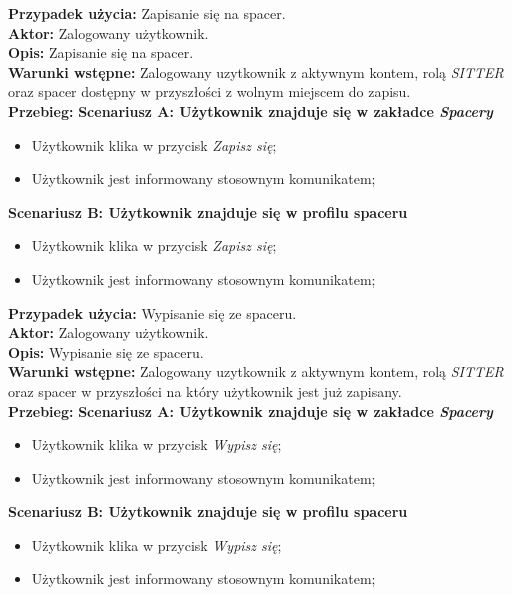 \noindent
\textbf{Przypadek użycia:} Zapisanie się na spacer. \\
\textbf{Aktor:} Zalogowany użytkownik. \\
\textbf{Opis:} Zapisanie się na spacer. \\
\textbf{Warunki wstępne:} Zalogowany uzytkownik z aktywnym kontem, rolą \textit{SITTER} oraz spacer dostępny w przyszłości z wolnym miejscem do zapisu. \\
\textbf{Przebieg:}
\textbf{Scenariusz A: Użytkownik znajduje się w zakładce \textit{Spacery}}
\begin{itemize}[leftmargin=1cm]
    \item Użytkownik klika w przycisk \textit{Zapisz się};
    \item Użytkownik jest informowany stosownym komunikatem;
\end{itemize}
\textbf{Scenariusz B: Użytkownik znajduje się w profilu spaceru}
\begin{itemize}[leftmargin=1cm]
    \item Użytkownik klika w przycisk \textit{Zapisz się};
    \item Użytkownik jest informowany stosownym komunikatem;
\end{itemize}

\noindent
\textbf{Przypadek użycia:} Wypisanie się ze spaceru. \\
\textbf{Aktor:} Zalogowany użytkownik. \\
\textbf{Opis:} Wypisanie się ze spaceru. \\
\textbf{Warunki wstępne:} Zalogowany uzytkownik z aktywnym kontem, rolą \textit{SITTER} oraz spacer w przyszłości na który użytkownik jest już zapisany. \\
\textbf{Przebieg:}
\textbf{Scenariusz A: Użytkownik znajduje się w zakładce \textit{Spacery}}
\begin{itemize}[leftmargin=1cm]
    \item Użytkownik klika w przycisk \textit{Wypisz się};
    \item Użytkownik jest informowany stosownym komunikatem;
\end{itemize}
\textbf{Scenariusz B: Użytkownik znajduje się w profilu spaceru}
\begin{itemize}[leftmargin=1cm]
    \item Użytkownik klika w przycisk \textit{Wypisz się};
    \item Użytkownik jest informowany stosownym komunikatem;
\end{itemize}

